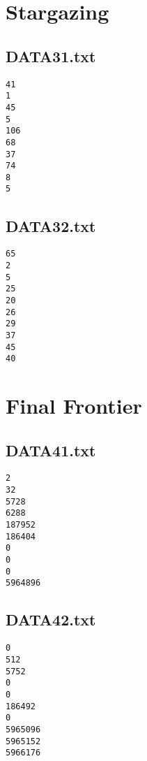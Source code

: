 \documentclass{article}
\begin{document}
\pagebreak


\section{Stargazing}

\subsection{DATA31.txt}

\begin{verbatim}
41
1
45
5
106
68
37
74
8
5
\end{verbatim}

\subsection{DATA32.txt}

\begin{verbatim}
65
2
5
25
20
26
29
37
45
40
\end{verbatim}


\pagebreak


\section{Final Frontier}

\subsection{DATA41.txt}

\begin{verbatim}
2
32
5728
6288
187952
186404
0
0
0
5964896
\end{verbatim}

\subsection{DATA42.txt}

\begin{verbatim}
0
512
5752
0
0
186492
0
5965096
5965152
5966176
\end{verbatim}
\end{document}
